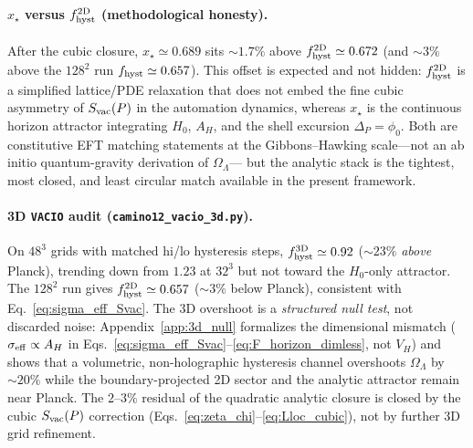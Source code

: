 \documentclass[prd,
               reprint,
               aps,
               preprintnumbers,
               nofootinbib,
               longbibliography,
               floatfix]{revtex4-2}
\begin{document}
\paragraph{$x_\star$ versus $f_{\rm hyst}^{\rm 2D}$ (methodological honesty).}
After the cubic closure, $x_\star\simeq 0.689$ sits $\sim 1.7\%$ above
$f_{\rm hyst}^{\rm 2D}\simeq 0.672$ (and $\sim 3\%$ above the
$128^2$ run $f_{\rm hyst}\simeq 0.657$).
This offset is expected and not hidden:
$f_{\rm hyst}^{\rm 2D}$ is a simplified lattice/PDE relaxation that
does not embed the fine cubic asymmetry of $S_{\rm vac}(P)$ in the
automation dynamics, whereas $x_\star$ is the continuous horizon attractor
integrating $H_0$, $A_H$, and the shell excursion $\Delta_P=\phi_0$.
Both are constitutive EFT matching statements at the Gibbons--Hawking
scale---not an ab initio quantum-gravity derivation of $\Omega_\Lambda$---
but the analytic stack is the tightest, most closed, and least circular
match available in the present framework.

\paragraph{3D \texttt{VACIO} audit (\texttt{camino12\_vacio\_3d.py}).}
On $48^3$ grids with matched hi/lo hysteresis steps,
$f_{\rm hyst}^{\rm 3D}\simeq 0.92$ ($\sim 23\%$ \emph{above} Planck),
trending down from $1.23$ at $32^3$ but not toward the $H_0$-only
attractor.
The $128^2$ run gives $f_{\rm hyst}^{\rm 2D}\simeq 0.657$
($\sim 3\%$ below Planck), consistent with
Eq.~\eqref{eq:sigma_eff_Svac}.
The 3D overshoot is a \emph{structured null test}, not discarded noise:
Appendix~\ref{app:3d_null} formalizes the dimensional mismatch
($\sigma_{\rm eff}\propto A_H$ in Eqs.~\eqref{eq:sigma_eff_Svac}--\eqref{eq:F_horizon_dimless},
not $V_H$) and shows that a volumetric, non-holographic hysteresis
channel overshoots $\Omega_\Lambda$ by $\sim 20\%$ while the
boundary-projected 2D sector and the analytic attractor remain near
Planck.
The $2$--$3\%$ residual of the quadratic analytic closure is closed by
the cubic $S_{\rm vac}(P)$ correction
(Eqs.~\eqref{eq:zeta_chi}--\eqref{eq:Lloc_cubic}), not by further 3D
grid refinement.
\end{document}
